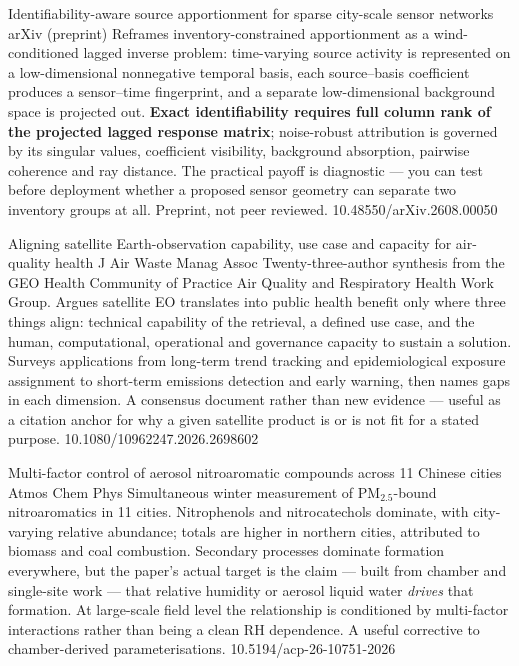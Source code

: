 \documentclass[10pt]{article}
\begin{document}
\clearpage


{Identifiability-aware source apportionment for sparse city-scale sensor networks}
{arXiv (preprint)}
{Reframes inventory-constrained apportionment as a wind-conditioned lagged inverse
problem: time-varying source activity is represented on a low-dimensional nonnegative
temporal basis, each source--basis coefficient produces a sensor--time fingerprint, and a
separate low-dimensional background space is projected out. \textbf{Exact identifiability
requires full column rank of the projected lagged response matrix}; noise-robust
attribution is governed by its singular values, coefficient visibility, background
absorption, pairwise coherence and ray distance. The practical payoff is diagnostic --- you
can test before deployment whether a proposed sensor geometry can separate two inventory
groups at all. Preprint, not peer reviewed.}
{10.48550/arXiv.2608.00050}

{Aligning satellite Earth-observation capability, use case and capacity for air-quality health}
{J Air Waste Manag Assoc}
{Twenty-three-author synthesis from the GEO Health Community of Practice Air Quality and
Respiratory Health Work Group. Argues satellite EO translates into public health benefit
only where three things align: technical capability of the retrieval, a defined use case,
and the human, computational, operational and governance capacity to sustain a solution.
Surveys applications from long-term trend tracking and epidemiological exposure assignment
to short-term emissions detection and early warning, then names gaps in each dimension. A
consensus document rather than new evidence --- useful as a citation anchor for why a given
satellite product is or is not fit for a stated purpose.}
{10.1080/10962247.2026.2698602}

{Multi-factor control of aerosol nitroaromatic compounds across 11 Chinese cities}
{Atmos Chem Phys}
{Simultaneous winter measurement of PM$_{2.5}$-bound nitroaromatics in 11 cities.
Nitrophenols and nitrocatechols dominate, with city-varying relative abundance; totals are
higher in northern cities, attributed to biomass and coal combustion. Secondary processes
dominate formation everywhere, but the paper's actual target is the claim --- built from
chamber and single-site work --- that relative humidity or aerosol liquid water
\emph{drives} that formation. At large-scale field level the relationship is conditioned
by multi-factor interactions rather than being a clean RH dependence. A useful corrective
to chamber-derived parameterisations.}
{10.5194/acp-26-10751-2026}
\end{document}
